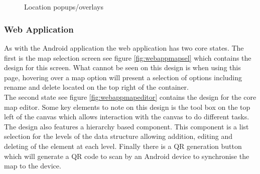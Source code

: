 \begin{figure}[h]
	\centering
	\begin{subfigure}[h]{.5\textwidth}
		\centering
		\\
		\caption{}
		\label{fig:locationpopupoptions}
	\end{subfigure}%
	\begin{subfigure}[h]{.5\textwidth}
		\centering
		\\
		\caption{}
		\label{fig:locationpopupsearch}
	\end{subfigure}
	\caption{Location popups/overlays}
	\label{fig:locationpopup}
\end{figure}


\pagebreak
\subsubsection{Web Application}
As with the Android application the web application has two core states. The first is the map selection screen see figure \ref{fig:webappmapsel} which contains the design for this screen. What cannot be seen on this design is when using this page, hovering over a map option will present a selection of options including rename and delete located on the top right of the container.\\

The second state see figure \ref{fig:webappmapeditor} contains the design for the core map editor. Some key elements to note on this design is the tool box on the top left of the canvas which allows interaction with the canvas to do different tasks. The design also features a hierarchy based component. This component is a list selection for the levels of the data structure allowing addition, editing and deleting of the element at each level. Finally there is a QR generation button which will generate a QR code to scan by an Android device to synchronise the map to the device.

